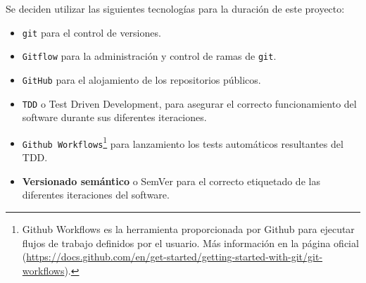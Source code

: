 Se deciden utilizar las siguientes tecnologías para la duración de este proyecto:

\begin{itemize}
    \item \verb|git| para el control de versiones.
    \item \verb|Gitflow|\cite{GitFlow} para la administración y control de ramas de \verb|git|.
    \item \verb|GitHub| para el alojamiento de los repositorios públicos.
    \item \verb|TDD| o Test Driven Development, para asegurar el correcto funcionamiento del software durante sus diferentes iteraciones.
    \item \verb|Github Workflows|\footnote{
        Github Workflows es la herramienta proporcionada por Github para ejecutar flujos de trabajo definidos por el usuario. Más información en la página oficial (\url{https://docs.github.com/en/get-started/getting-started-with-git/git-workflows}).
    } para lanzamiento los tests automáticos resultantes del TDD.
    \item \textbf{Versionado semántico} o SemVer para el correcto etiquetado de las diferentes iteraciones del software.
\end{itemize}
 
